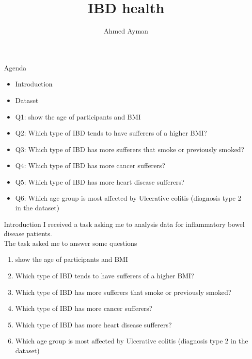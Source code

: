 \documentclass[8pt]{beamer}
\title{IBD health}
\author{Ahmed Ayman}
\begin{document}
        \maketitle
        \begin{frame}{Agenda}
            \begin{itemize}
                \item Introduction
                \item Dataset
                \item Q1: show the age of participants and BMI
                \item Q2: Which type of IBD tends to have sufferers of a higher BMI?
                \item Q3: Which type of IBD has more sufferers that smoke or previously smoked?
                \item Q4: Which type of IBD has more cancer sufferers?
                \item Q5: Which type of IBD has more heart disease sufferers?
                \item Q6: Which age group is most affected by Ulcerative colitis (diagnosis type 2 in the dataset)
            \end{itemize}
        \end{frame}

        \begin{frame}{Introduction}
            I received a task asking me to analysis data for inflammatory bowel disease patients.\\
            The task asked me to answer some questions
            \begin{enumerate}
                \item show the age of participants and BMI
                \item Which type of IBD tends to have sufferers of a higher BMI?
                \item Which type of IBD has more sufferers that smoke or previously smoked?
                \item Which type of IBD has more cancer sufferers?
                \item Which type of IBD has more heart disease sufferers?
                \item Which age group is most affected by Ulcerative colitis (diagnosis type 2 in the dataset)
            \end{enumerate}
        \end{frame}
\end{document}
